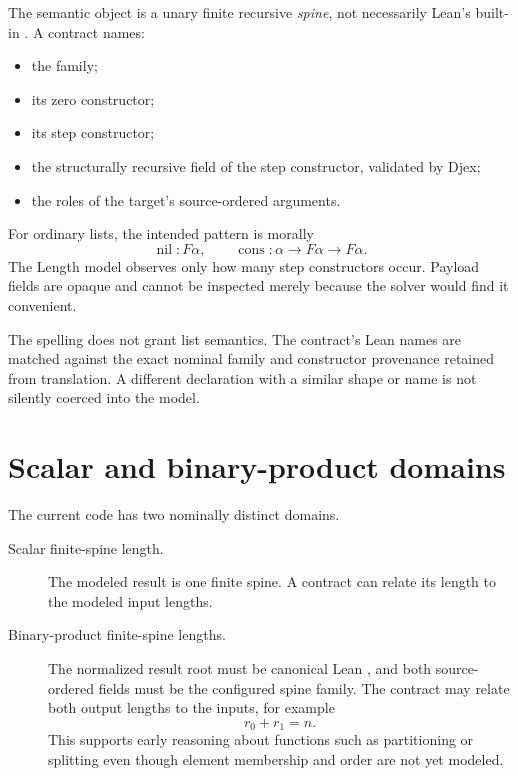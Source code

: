 \documentclass[10pt,letterpaper,oneside]{report}
\newcommand{\code}[1]{\texttt{\detokenize{#1}}}
\begin{document}
The semantic object is a unary finite recursive \emph{spine}, not necessarily Lean's built-in \code{List}. A contract names:

\begin{itemize}
\item the family;
\item its zero constructor;
\item its step constructor;
\item the structurally recursive field of the step constructor, validated by Djex;
\item the roles of the target's source-ordered arguments.
\end{itemize}

For ordinary lists, the intended pattern is morally
\[
  \operatorname{nil}:F\alpha,
  \qquad
  \operatorname{cons}:\alpha\to F\alpha\to F\alpha.
\]
The Length model observes only how many step constructors occur. Payload fields are opaque and cannot be inspected merely because the solver would find it convenient.

\begin{pitfall}
The spelling \code{List} does not grant list semantics. The contract's Lean names are matched against the exact nominal family and constructor provenance retained from translation. A different declaration with a similar shape or name is not silently coerced into the model.
\end{pitfall}

\section{Scalar and binary-product domains}

The current code has two nominally distinct domains.

\begin{description}
\item[Scalar finite-spine length.] The modeled result is one finite spine. A contract can relate its length to the modeled input lengths.

\item[Binary-product finite-spine lengths.] The normalized result root must be canonical Lean \code{Prod}, and both source-ordered fields must be the configured spine family. The contract may relate both output lengths to the inputs, for example
\[
  r_0+r_1=n.
\]
This supports early reasoning about functions such as partitioning or splitting even though element membership and order are not yet modeled.
\end{description}
\end{document}
